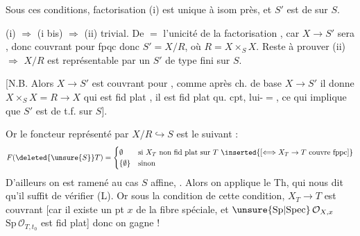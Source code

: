 
Sous ces conditions,  factorisation (i) est unique à isom près, et $S'$ est de  sur $S$.

(i) $\Rightarrow$ (i bis) $\Rightarrow$ (ii) trivial. De $=$ l'unicité de la factorisation , car $X\to S'$ sera , donc couvrant pour fpqc donc $S'=X/R$, où $R=X\times_S X$.
Reste à prouver (ii) $\Rightarrow$  $X/R$ est représentable par un $S'$ de  type fini sur $S$. 

[N.B. Alors $X\to S'$ est couvrant pour , comme après ch.  de base $X\to S'$ il donne $X\times_S X=R\longrightarrow X$ qui est fid plat , il est fid plat qu. cpt, lui-$=$, ce qui implique  que $S'$ est  de t.f.  sur $S$].

Or  le foncteur représenté par $X/R\hookrightarrow S$ est  le suivant :
\[
F(\deleted{\unsure{S}}T)=\begin{cases}
\emptyset&\text{si } X_T\ \text{non fid plat sur }T\ \inserted{[\Longleftrightarrow X_T\to T\ \text{couvre fppc}]}\\
\{\emptyset\}&\text{sinon}
\end{cases}
\]
D'ailleurs on est ramené au cas $S$ affine, .  Alors on applique le Th, qui nous dit qu'il suffit de vérifier  (L). Or sous la condition de cette condition, $X_T\to T$ est couvrant [car il existe un pt $x$ de la fibre spéciale, et $\unsure{\mathrm{Sp}|\mathrm{Spec}}\,\mathcal O_{X,x}$ \unsure{--|$\to$} $\mathrm{Sp}\,\mathcal O_{T,t_0}$ est fid plat] donc on gagne !
